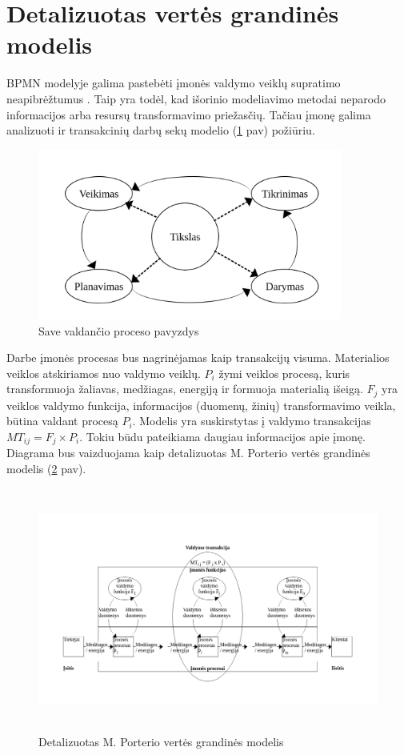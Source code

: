 \documentclass{VUMIFInfBakalaurinis}
\begin{document}
\section{Detalizuotas vertės grandinės modelis}
BPMN modelyje galima pastebėti įmonės valdymo veiklų supratimo neapibrėžtumus \cite{bpmnPorterModel}. Taip yra todėl, kad išorinio modeliavimo metodai neparodo informacijos arba resursų transformavimo priežasčių. Tačiau įmonę galima analizuoti ir transakcinių darbų sekų modelio (\ref{img:pdca} pav) požiūriu.  
\begin{figure}[H]
	\centering
	\includegraphics[width=10cm]{img/pdca}
	\caption{Save valdančio proceso pavyzdys}
	\label{img:pdca}
\end{figure} 

Darbe įmonės procesas bus nagrinėjamas kaip transakcijų visuma. Materialios veiklos atskiriamos nuo valdymo veiklų. $P_i$ žymi veiklos procesą, kuris transformuoja žaliavas, medžiagas, energiją ir formuoja materialią išeigą. $F_j$ yra veiklos valdymo funkcija, informacijos (duomenų, žinių) transformavimo veikla, būtina valdant procesą $P_i$. Modelis yra suskirstytas į valdymo transakcijas $ MT_{ij} = F_j \times P_i$. Tokiu būdu pateikiama daugiau informacijos apie įmonę. Diagrama bus vaizduojama kaip detalizuotas M. Porterio vertės grandinės modelis (\ref{img:detalized_porter_vcm} pav).

\begin{figure}[H]
	\centering
	\includegraphics[height=8cm]{img/detalized_porter_vcm}
	\caption{Detalizuotas M. Porterio vertės grandinės modelis}
	\label{img:detalized_porter_vcm}
\end{figure} 
\end{document}

